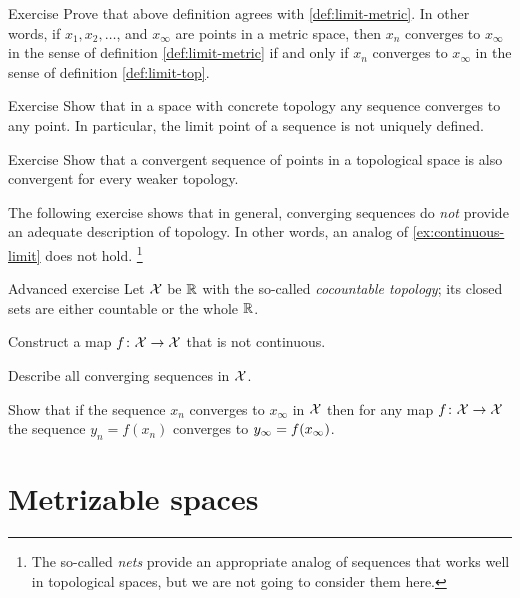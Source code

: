\begin{thm}{Exercise}
Prove that above definition agrees with \ref{def:limit-metric}.
In other words, if $x_1,x_2,\dots$, and $x_\infty$ are points in a metric space, then $x_n$ converges to $x_\infty$ in the sense of definition \ref{def:limit-metric} if and only if $x_n$ converges to $x_\infty$ in the sense of definition \ref{def:limit-top}.
\end{thm}

\begin{thm}{Exercise}
Show that in a space with concrete topology any sequence converges to any point.
In particular, the limit point of a sequence is not uniquely defined.
\end{thm}

\begin{thm}{Exercise}
Show that a convergent sequence of points in a topological space is also convergent for every weaker topology.
\end{thm}

The following exercise shows that in general, converging sequences do \emph{not} provide an adequate description of topology.
In other words, an analog of \ref{ex:continuous-limit} does not hold.%
\footnote{The so-called \emph{nets} provide an appropriate analog of sequences that works well in topological spaces, but we are not going to consider them here.}

\begin{thm}{Advanced exercise}
Let $\mathcal{X}$ be $\mathbb{R}$ with the so-called \emph{cocountable topology};
its closed sets are either countable or the whole $\mathbb{R}$.

\begin{subthm}{}
 Construct a map $f\colon\mathcal{X}\to \mathcal{X}$ that is not continuous.
\end{subthm}

\begin{subthm}{}
 Describe all converging sequences in $\mathcal{X}$.
\end{subthm}

\begin{subthm}{}
 Show that if the sequence $x_n$ converges to $x_\infty$ in $\mathcal{X}$ then for any map $f\colon\mathcal{X}\to \mathcal{X}$ the sequence $y_n=f(x_n)$ converges to $y_\infty\z=f(x_\infty)$.
\end{subthm}

\end{thm}

\section{Metrizable spaces}

